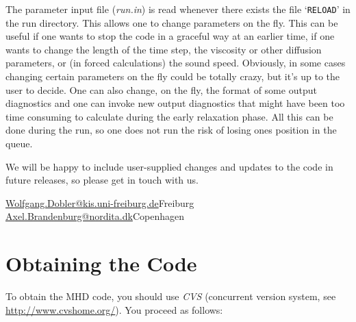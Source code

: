 \documentclass[12pt,twoside,notitlepage,a4paper]{article}
\makeatletter
\newcommand{\var}[1]{\textsl{#1}\index{#1@\emph{#1}}\/}
\newcommand{\file}[1]{`\texttt{#1}'}
\newcommand{\name}[1]{\textsl{#1}\index{#1}\/}
\makeatother
\begin{document}
The parameter input file (\var{run.in}) is read whenever there exists the
file \file{RELOAD} in the run directory. This allows one
to change parameters on the fly. This can be useful if one
wants to stop the code in a graceful way at an earlier time,
if one wants to change the length of the time step,
the viscosity or other diffusion parameters,
or (in forced calculations) the sound speed. Obviously, in
some cases changing certain parameters on the fly could be totally crazy,
but it's up to the user to decide.
One can also change, on the fly, the format of some output diagnostics
and one can invoke new output diagnostics that might have been too time
consuming to calculate during the early relaxation phase. All this can
be done during the run, so one does not run the risk of losing ones
position in the queue.

We will be happy to include user-supplied changes and updates to the code
in future releases, so please get in touch with us.

\vspace{5mm}
\url{Wolfgang.Dobler@kis.uni-freiburg.de}\hfill Freiburg\\
\url{Axel.Brandenburg@nordita.dk}\hfill Copenhagen

\tableofcontents
\clearpage
\pagestyle{fancy}



\section{Obtaining the Code}

To obtain the MHD code, you should use \name{CVS} (concurrent version
system, see \url{http://www.cvshome.org/}).
You proceed as follows:
\end{document}
